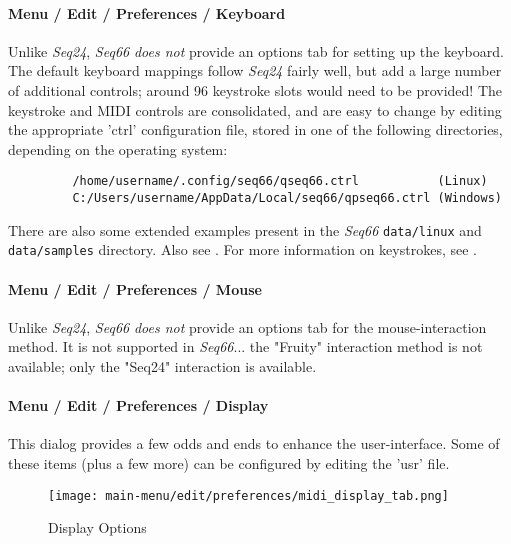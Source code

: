 \paragraph{Menu / Edit / Preferences / Keyboard}
\label{paragraph:menu_edit_preferences_keyboard}

   Unlike \textsl{Seq24}, \textsl{Seq66}
   \textsl{does not} provide an options tab for
   setting up the keyboard.
   The default keyboard mappings follow \textsl{Seq24} fairly well,
   but add a large number of additional controls;
   around 96 keystroke slots would need to be provided!
   The keystroke and MIDI controls are consolidated, and are easy to change by
   editing the appropriate 'ctrl' configuration file, stored in one of the
   following directories, depending on
   the operating system:
   
   \begin{verbatim}
         /home/username/.config/seq66/qseq66.ctrl           (Linux)
         C:/Users/username/AppData/Local/seq66/qpseq66.ctrl (Windows)
   \end{verbatim}

   There are also some extended examples present in the \textsl{Seq66}
   \texttt{data/linux} and
   \texttt{data/samples} directory.
   Also see .
   For more information on keystrokes, see
   .

\paragraph{Menu / Edit / Preferences / Mouse}
\label{paragraph:menu_edit_preferences_mouse}

   Unlike \textsl{Seq24}, \textsl{Seq66}
   \textsl{does not} provide an options tab for
   the mouse-interaction method.
   It is not supported in \textsl{Seq66}...
   the "Fruity" interaction method is not available;
   only the "Seq24" interaction is available.
 
\paragraph{Menu / Edit / Preferences / Display}
\label{paragraph:menu_edit_preferences_display}

   This dialog provides a few odds and ends to enhance the user-interface.
   Some of these items (plus a few more) can be configured by editing the 'usr'
   file.

\begin{figure}[H]
   \centering 
   \texttt{[image: main-menu/edit/preferences/midi\_display\_tab.png]}
   \caption{Display Options}
   \label{fig:midi_display_tab}
\end{figure}

